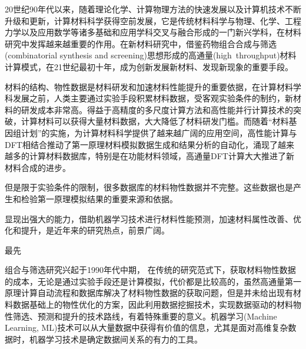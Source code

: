 \maketitle
20世纪90年代以来，随着理论化学、计算物理方法的快速发展以及计算机技术不断升级和更新，计算材料科学获得空前发展，它是传统材料科学与物理、化学、工程力学以及应用数学等诸多基础和应用学科交叉与融合形成的一门新兴学科，在材料研究中发挥越来越重要的作用。在新材料研究中，借鉴药物组合合成与筛选\textrm{(combinatorial synthesis and screening)}思想形成的高通量(\textrm{high~throughput})材料计算模式，在21世纪最初十年，成为创新发展新材料、发现新现象的重要手段。

材料的结构、物性数据是材料研发和加速材料性能提升的重要依据，在计算材料学科发展之前，人类主要通过实验手段积累材料数据，受客观实验条件的制约，新材料的研发成本非常高。得益于高精度的多尺度计算方法和高性能并行计算技术的突破，计算材料可以获得大量材料数据，大大降低了材料研发门槛。而随着“材料基因组计划”的实施，为计算材料科学提供了越来越广阔的应用空间，高性能计算与\textrm{DFT}相结合推动了第一原理材料模拟数据生成和结果分析的自动化，涌现了越来越多的计算材料数据库，特别是在功能材料领域，高通量\textrm{DFT}计算大大推进了新材料合成的进步。


但是限于实验条件的限制，很多数据库的材料物性数据并不完整。这些数据也是产生和检验第一原理模拟结果的重要来源和依据。

显现出强大的能力，借助机器学习技术进行材料性能预测，加速材料属性改善、优化和提升，是近年来的研究热点，前景广阔。


最先

组合与筛选研究兴起于1990年代中期，
在传统的研究范式下，获取材料物性数据的成本，无论是通过实验手段还是计算模拟，代价都是比较高的，虽然高通量第一原理计算自动流程和数据库解决了材料物性数据的获取问题，但是并未给出现有材料数据基础上的物性优化的方案，因此利用数据挖掘技术，实现数据驱动的材料物性筛选、预测和提升的技术路线，有着特殊重要的意义。机器学习\textrm{(Machine Learning, ML)}技术可以从大量数据中获得有价值的信息，尤其是面对高维复杂数据时，机器学习技术是确定数据间关系的有力的工具。


